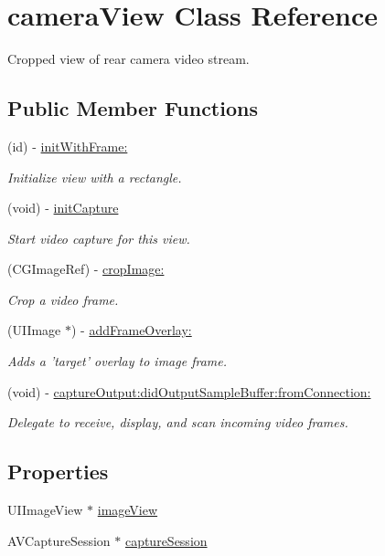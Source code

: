 \hypertarget{interfacecamera_view}{
\section{cameraView Class Reference}
\label{interfacecamera_view}
}


Cropped view of rear camera video stream.  


\subsection*{Public Member Functions}
\begin{DoxyCompactItemize}
\item 
(id) -\/ \hyperlink{interfacecamera_view_a2c60d41fcd0dc0a17172a1e081a1b47f}{initWithFrame:}
\begin{DoxyCompactList}\small\item\em Initialize view with a rectangle. \end{DoxyCompactList}\item 
(void) -\/ \hyperlink{interfacecamera_view_ae7f3e7153b93817e90d22f0a872a28d1}{initCapture}
\begin{DoxyCompactList}\small\item\em Start video capture for this view. \end{DoxyCompactList}\item 
(CGImageRef) -\/ \hyperlink{interfacecamera_view_a98f6390a43d2e68f9bc68a80a1619754}{cropImage:}
\begin{DoxyCompactList}\small\item\em Crop a video frame. \end{DoxyCompactList}\item 
(UIImage $\ast$) -\/ \hyperlink{interfacecamera_view_a1599e6698d617f02c46fe5ac78cc438d}{addFrameOverlay:}
\begin{DoxyCompactList}\small\item\em Adds a 'target' overlay to image frame. \end{DoxyCompactList}\item 
(void) -\/ \hyperlink{interfacecamera_view_ad02b926ab689e21915abf8cf1a9800cf}{captureOutput:didOutputSampleBuffer:fromConnection:}
\begin{DoxyCompactList}\small\item\em Delegate to receive, display, and scan incoming video frames. \end{DoxyCompactList}\end{DoxyCompactItemize}
\subsection*{Properties}
\begin{DoxyCompactItemize}
\item 
UIImageView $\ast$ \hyperlink{interfacecamera_view_a636153a51fbba10a8c14fb52b1f184a6}{imageView}
\item 
AVCaptureSession $\ast$ \hyperlink{interfacecamera_view_a6325249b12975d12ea28b956b46fae62}{captureSession}
\end{DoxyCompactItemize}


